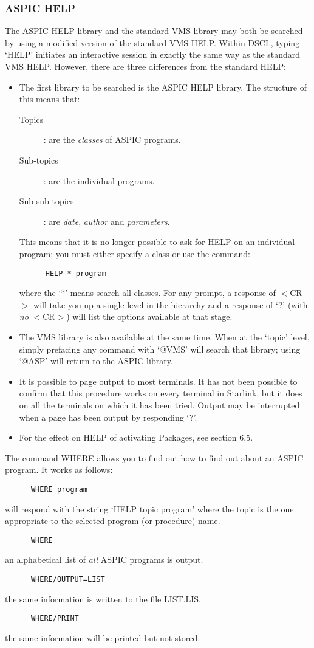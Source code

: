 \subsubsection {ASPIC HELP}
The ASPIC HELP library and the standard VMS library may both be searched by
using a modified version of the standard VMS HELP.
Within DSCL, typing `HELP' initiates an interactive session in exactly the same
way as the standard VMS HELP.
However, there are three differences from the standard HELP:
\begin{itemize}
\item The first library to be searched is the ASPIC HELP library. The structure
of this means that:
\begin{description}
\item [Topics]: are the {\em classes} of ASPIC programs.
\item [Sub-topics]: are the individual programs.
\item [Sub-sub-topics]: are {\em date}, {\em author} and {\em parameters}.
\end{description}
This means that it is no-longer possible to ask for HELP on an individual
program; you must either specify a class or use the command:
\begin{verbatim}
      HELP * program
\end{verbatim}
where the `*' means search all classes.
For any prompt, a response of $<$CR$>$ will take you up a single
level in the hierarchy and a response of `?' (with {\em no} $<$CR$>$) will list
the options available at that stage.
\item The VMS library is also available at the same time.
When at the `topic' level, simply prefacing any command with `@VMS' will search
that library; using `@ASP' will return to the ASPIC library.
\item It is possible to page output to most terminals.
It has not been possible to confirm that this procedure works on every terminal
in Starlink, but it does on all the terminals on which it has been tried.
Output may be interrupted when a page has been output by responding `?'.
\item For the effect on HELP of activating Packages, see section 6.5.
\end{itemize}
The command WHERE allows you to find out how to find out about an ASPIC
program.
It works as follows:
\begin{verbatim}
      WHERE program
\end{verbatim}
will respond with the string `HELP topic program' where the topic is the one
appropriate to the selected program (or procedure) name.
\begin{verbatim}
      WHERE
\end{verbatim}
an alphabetical list of {\em all} ASPIC programs is output.
\begin{verbatim}
      WHERE/OUTPUT=LIST
\end{verbatim}
the same information is written to the file LIST.LIS.
\begin{verbatim}
      WHERE/PRINT
\end{verbatim}
the same information will be printed but not stored.

